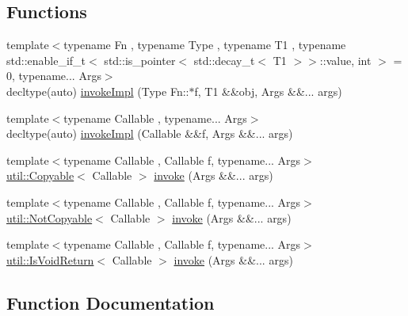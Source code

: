 \subsection*{Functions}
\begin{DoxyCompactItemize}
\item 
{\footnotesize template$<$typename Fn , typename Type , typename T1 , typename std\+::enable\+\_\+if\+\_\+t$<$ std\+::is\+\_\+pointer$<$ std\+::decay\+\_\+t$<$ T1 $>$$>$\+::value, int $>$  = 0, typename... Args$>$ }\\decltype(auto) \hyperlink{namespacevt_1_1runnable_a4253e4fa9c8c6e68da420ab440f2b298}{invoke\+Impl} (Type Fn\+::$\ast$f, T1 \&\&obj, Args \&\&... args)
\item 
{\footnotesize template$<$typename Callable , typename... Args$>$ }\\decltype(auto) \hyperlink{namespacevt_1_1runnable_af14b1c72fc3bf8437c2b89021af7eecf}{invoke\+Impl} (Callable \&\&f, Args \&\&... args)
\item 
{\footnotesize template$<$typename Callable , Callable f, typename... Args$>$ }\\\hyperlink{namespacevt_1_1util_ae9a553985cdc8e9bd4e55f55161f2929}{util\+::\+Copyable}$<$ Callable $>$ \hyperlink{namespacevt_1_1runnable_a14fa3dbf3bef4a683fc7284452b766d3}{invoke} (Args \&\&... args)
\item 
{\footnotesize template$<$typename Callable , Callable f, typename... Args$>$ }\\\hyperlink{namespacevt_1_1util_a0760a3963341a602dfe2dfc42d78c867}{util\+::\+Not\+Copyable}$<$ Callable $>$ \hyperlink{namespacevt_1_1runnable_aa86b7892ea9590c2e8fef9ed0ca4e80c}{invoke} (Args \&\&... args)
\item 
{\footnotesize template$<$typename Callable , Callable f, typename... Args$>$ }\\\hyperlink{namespacevt_1_1util_a97df3e28837417537b3bc035c74f064d}{util\+::\+Is\+Void\+Return}$<$ Callable $>$ \hyperlink{namespacevt_1_1runnable_ad7a4c11af0d8864939dca87f89fba1cb}{invoke} (Args \&\&... args)
\end{DoxyCompactItemize}


\subsection{Function Documentation}
\mbox{\label{namespacevt_1_1runnable_a14fa3dbf3bef4a683fc7284452b766d3}} 
